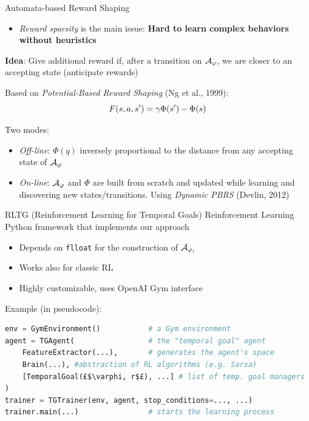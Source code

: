 \documentclass{beamer}
\begin{document}
\begin{frame}{Automata-based Reward Shaping}
	\begin{itemize}
		\item \emph{Reward sparsity} is the main issue: \textbf{Hard to learn complex behaviors without heuristics}
	\end{itemize}

	

	
	\textbf{Idea}: Give additional reward if, after a transition on $\mathcal{A}_\varphi$, we are closer to an accepting state (anticipate rewards)
	
	Based on \emph{Potential-Based Reward Shaping} (Ng et al., 1999):
	\[F(s,a,s') = \gamma\Phi(s') - \Phi(s)\]
	
	Two modes:
	\begin{itemize}
		\item \emph{Off-line}: $\Phi(q)$ inversely proportional to the distance from any accepting state of $\mathcal{A}_\varphi$ 
		\item \emph{On-line}: $\mathcal{A}_\varphi$ and $\Phi$ are built from scratch and updated while learning and discovering new states/transitions. Using \emph{Dynamic PBRS} (Devlin, 2012)
	\end{itemize}
	
\end{frame}

\begin{frame}[fragile]{RLTG (Reinforcement Learning for Temporal Goals)}
	Reinforcement Learning Python framework that implements our approach
	\begin{itemize}
		\item Depends on \texttt{flloat} for the construction of $\mathcal{A}_{\varphi_i}$
		\item Works also for classic RL
		\item Highly customizable, uses OpenAI Gym interface
	\end{itemize}
	Example (in pseudocode):
\begin{lstlisting}[language=Python, style=Python, numbers=none, escapechar = £]
env = GymEnvironment()           # a Gym environment 
agent = TGAgent(                 # the "temporal goal" agent
    FeatureExtractor(...),       # generates the agent's space
    Brain(...), #abstraction of RL algorithms (e.g. Sarsa)
    [TemporalGoal(£$\varphi, r$£), ...] # list of temp. goal managers
)
trainer = TGTrainer(env, agent, stop_conditions=..., ...)
trainer.main(...)                # starts the learning process

\end{lstlisting}
\end{frame}
\end{document}
